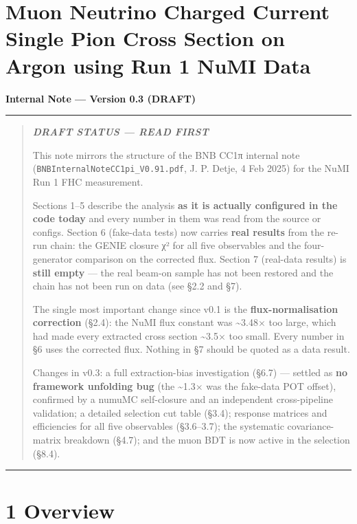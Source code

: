 \documentclass[11pt]{article}
\begin{document}
\section*{Muon Neutrino Charged Current Single Pion Cross Section on Argon using Run 1 NuMI Data}

\textbf{Internal Note — Version 0.3 (DRAFT)}

\vspace{0.5em}\hrule\vspace{0.5em}

\begin{quote}\itshape
\textbf{DRAFT STATUS — READ FIRST}

This note mirrors the structure of the BNB CC1π internal note (\texttt{BNBInternalNoteCC1pi\_V0.91.pdf}, J. P. Detje, 4 Feb 2025) for the NuMI Run 1 FHC measurement.

Sections 1–5 describe the analysis \textbf{as it is actually configured in the code today} and every number in them was read from the source or configs. Section 6 (fake-data tests) now carries \textbf{real results} from the re-run chain: the GENIE closure χ² for all five observables and the four-generator comparison on the corrected flux. Section 7 (real-data results) is \textbf{still empty} — the real beam-on sample has not been restored and the chain has not been run on data (see §2.2 and §7).

The single most important change since v0.1 is the \textbf{flux-normalisation correction} (§2.4): the NuMI flux constant was \textasciitilde{}3.48× too large, which had made every extracted cross section \textasciitilde{}3.5× too small. Every number in §6 uses the corrected flux. Nothing in §7 should be quoted as a data result.

Changes in v0.3: a full extraction-bias investigation (§6.7) — settled as \textbf{no framework unfolding bug} (the \textasciitilde{}1.3× was the fake-data POT offset), confirmed by a numuMC self-closure and an independent cross-pipeline validation; a detailed selection cut table (§3.4); response matrices and efficiencies for all five observables (§3.6–3.7); the systematic covariance-matrix breakdown (§4.7); and the muon BDT is now active in the selection (§8.4).
\end{quote}

\vspace{0.5em}\hrule\vspace{0.5em}

\section*{1 Overview}
\end{document}
